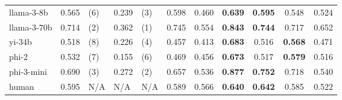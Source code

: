 \begin{tabular}{
        @{}lllllcccccc@{}
        }
        llama-3-8b   & 0.565                       & (6)                             & 0.239                        & (3)                               & 0.598      & 0.460                                            & \textbf{0.639}                     & \textbf{0.595}                     & 0.548          & 0.524          \\
        llama-3-70b  & 0.714                       & (2)                             & 0.362                        & (1)                               & 0.745      & 0.554                                            & \textbf{0.843}                     & \textbf{0.744}                     & 0.717          & 0.652          \\
        yi-34b       & 0.518                       & (8)                             & 0.226                        & (4)                               & 0.457      & 0.413                                            & \textbf{0.683}                     & 0.516                              & \textbf{0.568} & 0.471          \\
        phi-2        & 0.532                       & (7)                             & 0.155                        & (6)                               & 0.469      & 0.456                                            & \textbf{0.673}                     & 0.517                              & \textbf{0.579} & 0.516          \\
        phi-3-mini   & 0.690                       & (3)                             & 0.272                        & (2)                               & 0.657      & 0.536                                            & \textbf{0.877}                     & \textbf{0.752}                     & 0.718          & 0.540          \\
        \cmidrule{1-11}
        human        & 0.595                       & N/A                             & N/A                          & N/A                               & 0.589      & 0.566                                            & \textbf{0.640}                     & \textbf{0.642}                     & 0.585          & 0.522          \\
        \bottomrule
    \end{tabular}

